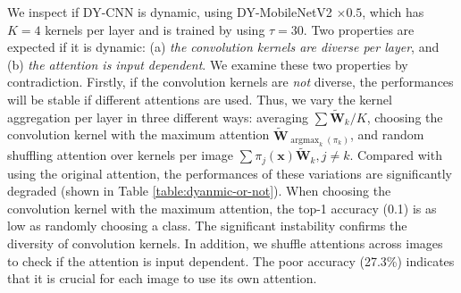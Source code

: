 \documentclass[10pt,twocolumn,letterpaper]{article}
\DeclareMathOperator*{\argmax}{argmax} %
\begin{document}
We inspect if DY-CNN is dynamic, using DY-MobileNetV2 $\times0.5$, which has $K=4$ kernels per layer and is trained by using $\tau=30$. Two properties are expected if it is dynamic: (a) \textit{the convolution kernels are diverse per layer}, and (b) \textit{the attention is input dependent}. 
We examine these two properties by contradiction. Firstly, if the convolution kernels are \textit{not} diverse, the performances will be stable if different attentions are used. Thus, we vary the kernel aggregation per layer in three different ways: averaging $\sum\bm{\tilde{W}}_k/K$, choosing the convolution kernel with the maximum attention $\bm{\tilde{W}}_{\argmax_{k}(\pi_k)}$, and random shuffling attention over kernels per image $\sum\pi_j(\bm{x})\bm{\tilde{W}}_k, j \ne k$.
Compared with using the original attention, the performances of these variations are significantly degraded (shown in Table \ref{table:dyanmic-or-not}). When choosing the convolution kernel with the maximum attention, the top-1 accuracy (0.1) is as low as randomly choosing a class. The significant instability confirms the diversity of convolution kernels. In addition, we shuffle attentions across images to check if the attention is input dependent. The poor accuracy (27.3\%) indicates that it is crucial for each image to use its own attention.
\end{document}
